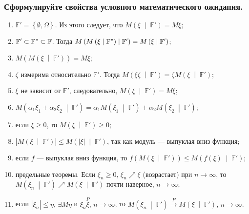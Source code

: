 \subsubsection*{Сформулируйте свойства условного математического ожидания.}

\begin{enumerate}
  \item $ \mathbb{F'} = \left\{ \emptyset, \Omega \right\} $.
  Из этого следует, что $M \left( \xi \; \middle| \; \mathbb{F'} \right) = M \xi $;
  \item $ \mathbb{F'} \subset \mathbb{F"} \subset \mathbb{F}$.
  Тогда
  $M \left( M \left( \xi \; \middle| \; \mathbb{F"} \right) \; \middle| \; \mathbb{F'} \right) =
    M \left( \xi \; \middle| \; \mathbb{F'} \right) $;
  \item $M \left( M \left( \xi \; \middle| \; \mathbb{F'} \right) \right) = M \xi $;
  \item $ \zeta $ измерима относительно $ \mathbb{F'}$.
  Тогда
  $M \left( \xi \zeta \; \middle| \; \mathbb{F'} \right) =
    \zeta M \left( \xi \; \middle| \; \mathbb{F'} \right) $;
  \item $ \xi $ не зависит от $ \mathbb{F'}$, следовательно,
  $M \left( \xi \; \middle| \; \mathbb{F'} \right) =
    M \xi $;
  \item $M \left( \alpha_1 \xi_1 + \alpha_2 \xi_2 \; \middle| \; \mathbb{F'} \right) =
    \alpha_1 M \left( \xi_1 \; \middle| \; \mathbb{F'} \right) +
    \alpha_2 M \left( \xi_2 \; \middle| \; \mathbb{F'} \right) $;
  \item если $ \xi \geq 0$, то $M \left( \xi \; \middle| \; \mathbb{F'} \right) \geq 0$;
  \item $ \left| M \left( \xi \; \middle| \; \mathbb{F'} \right) \right| \leq
    M \left( \left| \xi \right| \; \middle| \; \mathbb{F'} \right) $,
  так как модуль --- выпуклая вниз функция;
  \item если $f$ --- выпуклая вниз функция,
  то $f \left( M \left( \xi \; \middle| \; \mathbb{F'} \right) \right) \leq
    M \left( f \left( \xi \right) \; \middle| \; \mathbb{F'} \right) $;
  \item предельные теоремы.
  Если $ \xi_n \geq 0, \, \xi_n \nearrow \xi $ (возрастает) при $n \to \infty $,
  то
  $M \left( \xi_n \; \middle| \; \mathbb{F'} \right) \nearrow
    M \left( \xi \; \middle| \; \mathbb{F'} \right) $
  почти наверное, $n \to \infty $;
  \item если $ \left| \xi_n \right| \leq \eta, \, \exists M \eta $ и
  $ \xi_n \overset{P} \xi, \, n \to \infty $,
  то
  $M \left( \xi_n \; \middle| \; \mathbb{F'} \right) \overset{P}{ \to }
    M \left( \xi \; \middle| \; \mathbb{F'} \right), \,
    n \to \infty.$
\end{enumerate}

